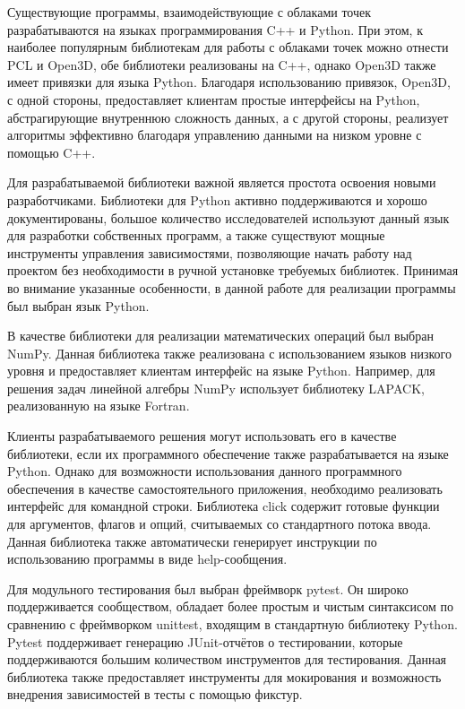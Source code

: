 Существующие программы, взаимодействующие с облаками точек разрабатываются на
языках программирования C++ и Python. При этом, к наиболее популярным
библиотекам для работы с облаками точек можно отнести PCL и Open3D, обе
библиотеки реализованы на C++, однако Open3D также имеет привязки для языка
Python. Благодаря использованию привязок, Open3D, с одной стороны, предоставляет
клиентам простые интерфейсы на Python, абстрагирующие внутреннюю сложность
данных, а с другой стороны, реализует алгоритмы эффективно благодаря управлению
данными на низком уровне с помощью C++.

Для разрабатываемой библиотеки важной является простота освоения новыми
разработчиками. Библиотеки для Python активно поддерживаются и хорошо
документированы, большое количество исследователей используют данный язык для
разработки собственных программ, а также существуют мощные инструменты
управления зависимостями, позволяющие начать работу над проектом без
необходимости в ручной установке требуемых библиотек. Принимая во внимание
указанные особенности, в данной работе для реализации программы был выбран язык
Python.

В качестве библиотеки для реализации математических операций был выбран NumPy.
Данная библиотека также реализована с использованием языков низкого уровня и
предоставляет клиентам интерфейс на языке Python. Например, для решения задач
линейной алгебры NumPy использует библиотеку LAPACK, реализованную на языке
Fortran.

Клиенты разрабатываемого решения могут использовать его в качестве библиотеки,
если их программного обеспечение также разрабатывается на языке Python. Однако
для возможности использования данного программного обеспечения в качестве
самостоятельного приложения, необходимо реализовать интерфейс для командной
строки. Библиотека click содержит готовые функции для аргументов, флагов и
опций, считываемых со стандартного потока ввода. Данная библиотека также
автоматически генерирует инструкции по использованию программы в виде
help-сообщения.

Для модульного тестирования был выбран фреймворк pytest. Он широко
поддерживается сообществом, обладает более простым и чистым синтаксисом по
сравнению с фреймворком unittest, входящим в стандартную библиотеку Python.
Pytest поддерживает генерацию JUnit-отчётов о тестировании, которые
поддерживаются большим количеством инструментов для тестирования. Данная
библиотека также предоставляет инструменты для мокирования и возможность
внедрения зависимостей в тесты с помощью фикстур.

